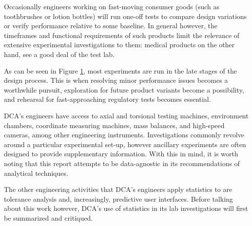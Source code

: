 \documentclass[11pt,a4paper,article]{memoir} %
\begin{document}
Occasionally engineers working on fast-moving consumer goods (such as toothbrushes or lotion bottles) will run one-off tests to compare design variations or verify performance relative to some baseline. In general however, the timeframes and functional requirements of such products limit the relevance of extensive experimental investigations to them: medical products on the other hand, see a good deal of the test lab.
\par
As can be seen in Figure \ref{fig:time_of_tests}, most experiments are run in the late stages of the design process. This is when resolving minor performance issues becomes a worthwhile pursuit, exploration for future product variants become a possibility, and rehearsal for fast-approaching regulatory tests becomes essential.
\begin{figure}
\label{fig:time_of_tests}
\end{figure}
\par
DCA's engineers have access to axial and torsional testing machines, environment chambers, coordinate measuring machines, mass balances, and high-speed cameras, among other engineering instruments. Investigations commonly revolve around a particular experimental set-up, however ancillary experiments are often designed to provide supplementary information. With this in mind, it is worth noting that this report attempts to be data-agnostic in its recommendations of analytical techniques.
\par
The other engineering activities that DCA's engineers apply statistics to are tolerance analysis and, increasingly, predictive user interfaces. Before talking about this work however, DCA's use of statistics in its lab investigations will first be summarized and critiqued.

\end{document}
